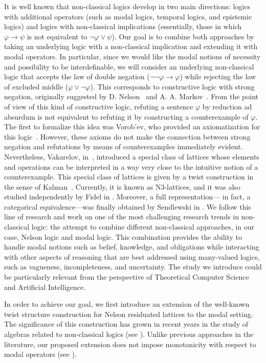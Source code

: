 \documentclass[pdflatex,sn-mathphys-num]{sn-jnl}%
\theoremstyle{thmstyleone}%
\theoremstyle{thmstyletwo}%
\theoremstyle{thmstylethree}%
\begin{document}
It is well known that non-classical logics develop in two main directions: logics with additional operators (such as modal logics, temporal logics, and epistemic logics) and logics with non-classical implications (essentially, those in which $\varphi \to \psi$ is not equivalent to $\neg \varphi \vee \psi$). Our goal is to combine both approaches by taking an underlying logic with a non-classical implication and extending it with modal operators. In particular, since we would like the modal notions of necessity and possibility to be interdefinable, we will consider an underlying non-classical logic that accepts the law of double negation ($\neg \neg \varphi \to \varphi$) while rejecting the law of excluded middle ($\varphi \vee \neg \varphi$). This corresponds to constructive logic with strong negation, originally suggested by D. Nelson~\cite{Nelson49} and A. A. Markov~\cite{Markov50}. From the point of view of this kind of constructive logic, refuting a sentence $\varphi$ by reduction ad absurdum is not equivalent to refuting it by constructing a counterexample of $\varphi$. The first to formalize this idea was Vorob'ev, who provided an axiomatization for this logic~\cite{Vorobev52}. However, these axioms do not make the connection between strong negation and refutations by means of counterexamples immediately evident. Nevertheless, Vakarelov, in~\cite{Vak77}, introduced a special class of lattices whose elements and operations can be interpreted in a way very close to the intuitive notion of a counterexample. This special class of lattices is given by a twist construction in the sense of Kalman~\cite{Kalman58}. Currently, it is known as N3-lattices, and it was also studied independently by Fidel in \cite{Fidel78}. Moreover, a full representation— in fact, a categorical equivalence—was finally obtained by Sendlewski in \cite{Sendlewski}. We follow this line of research and work on one of the most challenging research trends in non-classical logic: the attempt to combine different non-classical approaches, in our case, Nelson logic and modal logic. This combination provides the ability to handle modal notions such as belief, knowledge, and obligations while interacting with other aspects of reasoning that are best addressed using many-valued logics, such as vagueness, incompleteness, and uncertainty. The study we introduce could be particularly relevant from the perspective of Theoretical Computer Science and Artificial Intelligence.

In order to achieve our goal, we first introduce an extension of the well-known twist structure construction for Nelson residuated lattices to the modal setting. The significance of this construction has grown in recent years in the study of algebras related to non-classical logics (see \cite{Busaniche, Galatos2004, RiviOno2014}). Unlike previous approaches in the literature, our proposed extension does not impose monotonicity with respect to modal operators (see \cite{JanRivi2014}).
\end{document}
